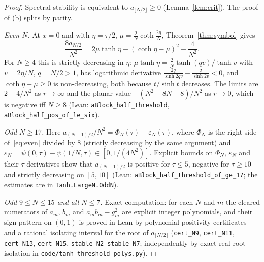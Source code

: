 \documentclass[11pt]{article}
\theoremstyle{definition}
\theoremstyle{remark}
\newcommand{\lean}[1]{\nolinkurl{#1}}
\begin{document}
\begin{proof}
Spectral stability is equivalent to $a_{\lfloor N/2\rfloor}\ge0$ (Lemma~\ref{lem:crit}). The proof of (b) splits by parity.

\emph{Even $N$.} At $x=0$ and with $\eta=\tau/2$, $\mu=\frac2N\coth\frac{2\eta}N$, Theorem~\ref{thm:symbol} gives
\begin{equation}\label{eq:even}
\frac{8a_{N/2}}{N^2}=2\mu\tanh\eta-(\coth\eta-\mu)^2-\frac4{N^2}.
\end{equation}
For $N\ge4$ this is strictly decreasing in $\eta$: $\mu\tanh\eta=\frac2N\tanh(qv)/\tanh v$ with $v=2\eta/N$, $q=N/2>1$, has
logarithmic derivative $\frac{2q}{\sinh2qv}-\frac2{\sinh2v}<0$, and $\coth\eta-\mu\ge0$ is non-decreasing, both because
$t/\sinh t$ decreases. The limits are $2-4/N^2$ as $r\to\infty$ and the planar value $-(N^2-8N+8)/N^2$ as $r\to0$, which is
negative iff $N\ge8$ (Lean: \lean{aBlock_half_threshold}, \lean{aBlock_half_pos_of_le_six}).

\emph{Odd $N\ge17$.} Here $a_{(N-1)/2}/N^2=\Phi_N(\tau)+\varepsilon_N(\tau)$, where $\Phi_N$ is the right side of~\eqref{eq:even}
divided by $8$ (strictly decreasing by the same argument) and $\varepsilon_N=\psi(0,\tau)-\psi(1/N,\tau)\in[0,1/(4N^2)]$.
Explicit bounds on $\Phi_N$, $\varepsilon_N$ and their $\tau$-derivatives show that $a_{(N-1)/2}$ is positive for $\tau\le5$,
negative for $\tau\ge10$ and strictly decreasing on $[5,10]$ (Lean: \lean{aBlock_half_threshold_of_ge_17}; the estimates
are in \lean{Tanh.LargeN.OddN}).

\emph{Odd $9\le N\le15$ and all $N\le7$.} Exact computation: for each $N$ and $m$ the cleared numerators of $a_m$, $b_m$ and
$a_mb_m-g_m^2$ are explicit integer polynomials, and their sign pattern on $(0,1)$ is proved in Lean by polynomial
positivity certificates and a rational isolating interval for the root of $a_{\lfloor N/2\rfloor}$
(\lean{cert_N9}, \lean{cert_N11}, \lean{cert_N13}, \lean{cert_N15}, \lean{stable_N2}--\lean{stable_N7}; independently by exact
real-root isolation in \nolinkurl{code/tanh_threshold_polys.py}).
\end{proof}
\end{document}
